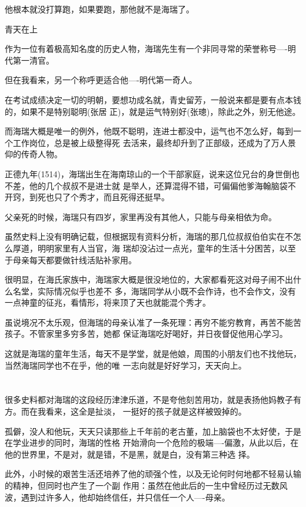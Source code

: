 \documentclass[11pt,a4paper,onecolumn]{article}
\begin{document}
他根本就没打算跑，如果要跑，那他就不是海瑞了。

青天在上

作为一位有着极高知名度的历史人物，海瑞先生有一个非同寻常的荣誉称号----明代第一清官。

但在我看来，另一个称呼更适合他----明代第一奇人。

在考试成绩决定一切的明朝，要想功成名就，青史留芳，一般说来都是要有点本钱的，如果不是特别聪明(张居
正)，就是运气特别好(张璁)，除此之外，别无他途。

而海瑞大概是唯一的例外，他既不聪明，连进士都没中，运气也不怎么好，每到一个工作岗位，总是被上级整得死
去活来，最终却升到了正部级，还成为了万人景仰的传奇人物。

正德九年(1514)，海瑞出生在海南琼山的一个干部家庭，说来这位兄台的身世倒也不差，他的几个叔叔不是进士就
是举人，还算混得不错，可偏偏他爹海翰脑袋不开窍，到死也只了个秀才，而且死得还挺早。

父亲死的时候，海瑞只有四岁，家里再没有其他人，只能与母亲相依为命。

虽然史料上没有明确记载，但根据现有资料分析，海瑞的那几位叔叔伯伯实在不怎么厚道，明明家里有人当官，海
瑞却没沾过一点光，童年的生活十分困苦，以至于母亲每天都要做针线活贴补家用。

很明显，在海氏家族中，海瑞家大概是很没地位的，大家都看死这对母子闹不出什么名堂，实际情况似乎也差不
多，海瑞同学从小既不会作诗，也不会作文，没有一点神童的征兆，看情形，将来顶了天也就能混个秀才。

虽说境况不太乐观，但海瑞的母亲认准了一条死理：再穷不能穷教育，再苦不能苦孩子。不管家里多穷多苦，她都
保证海瑞吃好喝好，并日夜督促他用心学习。

这就是海瑞的童年生活，每天不是学堂，就是他娘，周围的小朋友们也不找他玩，当然海瑞同学也不在乎，他的唯
一志向就是好好学习，天天向上。

\section[\thesection]{}

很多史料都对海瑞的这段经历津津乐道，不是夸他刻苦用功，就是表扬他妈教子有方。而在我看来，这全是扯淡，
一挺好的孩子就是这样被毁掉的。

孤僻，没人和他玩，天天只读那些上千年前的老古董，加上脑袋也不太好使，于是在学业进步的同时，海瑞的性格
开始滑向一个危险的极端----偏激，从此以后，在他的世界里，不是对，就是错，不是黑，就是白，没有第三种选
择。

此外，小时候的艰苦生活还培养了他的顽强个性，以及无论何时何地都不轻易认输的精神，但同时也产生了一个副
作用：虽然在他此后的一生中曾经历过无数风波，遇到过许多人，他却始终信任，并只信任一个人----母亲。
\end{document}
